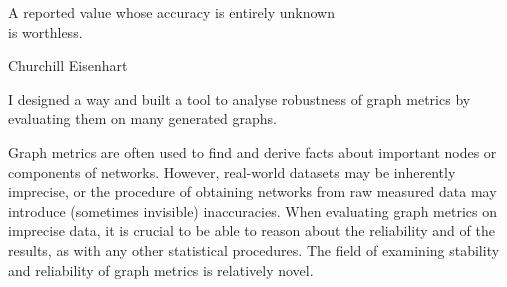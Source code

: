 \epigraph{A reported value whose accuracy is entirely unknown\\ is worthless.}{Churchill Eisenhart~\cite{EisenhartExpressionUncertaintiesFinal1968}}

%
%


I designed a way and built a tool to analyse robustness of graph metrics by evaluating them on many generated graphs.

Graph metrics are often used to find and derive facts about important nodes or components of networks.
However, real-world datasets may be inherently imprecise, or the procedure of obtaining networks from raw measured data may introduce (sometimes invisible) inaccuracies.
When evaluating graph metrics on imprecise data, it is crucial to be able to reason about the reliability and of the results, as with any other statistical procedures.
The field of examining stability and reliability of graph metrics is relatively novel.

